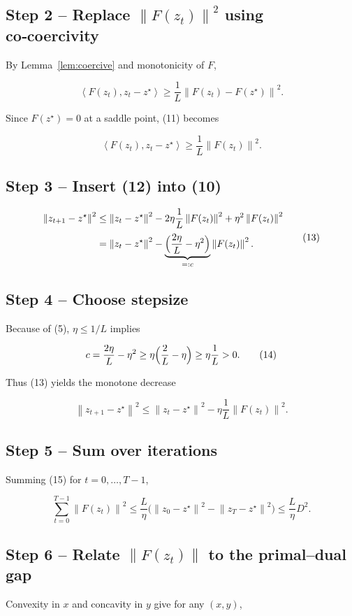 \documentclass{article}
\newcommand{\norm}[1]{\left\|#1\right\|}
\newcommand{\inner}[2]{\left\langle #1,#2\right\rangle}
\begin{document}
\subsection*{Step 2 – Replace \(\norm{F(z_t)}^2\) using co‑coercivity}
By Lemma~\ref{lem:coercive} and monotonicity of \(F\),

\[
\inner{F(z_t)}{z_t-z^\star}\ge 
\frac{1}{L}\norm{F(z_t)-F(z^\star)}^2 .
\tag{11}
\]

Since \(F(z^\star)=0\) at a saddle point, (11) becomes  

\[
\inner{F(z_t)}{z_t-z^\star}\ge\frac{1}{L}\norm{F(z_t)}^2 .
\tag{12}
\]

\subsection*{Step 3 – Insert (12) into (10)}
\[
\begin{aligned}
\norm{z_{t+1}-z^\star}^2
&\le \norm{z_t-z^\star}^2-2\eta\frac{1}{L}\norm{F(z_t)}^2
      +\eta^2\norm{F(z_t)}^2\\[2pt]
&= \norm{z_t-z^\star}^2-\underbrace{\Bigl(\frac{2\eta}{L}-\eta^2\Bigr)}_{=:c}\norm{F(z_t)}^2 .
\end{aligned}
\tag{13}
\]

\subsection*{Step 4 – Choose stepsize}
Because of (5), \(\eta\le 1/L\) implies  

\[
c = \frac{2\eta}{L}-\eta^2 \ge \eta\Bigl(\frac{2}{L}-\eta\Bigr)\ge \eta\frac{1}{L}>0 .
\tag{14}
\]

Thus (13) yields the monotone decrease  

\[
\norm{z_{t+1}-z^\star}^2\le \norm{z_t-z^\star}^2-\eta\frac{1}{L}\norm{F(z_t)}^2 .
\tag{15}
\]

\subsection*{Step 5 – Sum over iterations}
Summing (15) for \(t=0,\dots,T-1\),

\[
\sum_{t=0}^{T-1}\norm{F(z_t)}^2
\le \frac{L}{\eta}\bigl(\norm{z_0-z^\star}^2-\norm{z_T-z^\star}^2\bigr)
\le \frac{L}{\eta}D^2 .
\tag{16}
\]

\subsection*{Step 6 – Relate \(\norm{F(z_t)}\) to the primal–dual gap}
Convexity in \(x\) and concavity in \(y\) give for any \((x,y)\),
\end{document}
